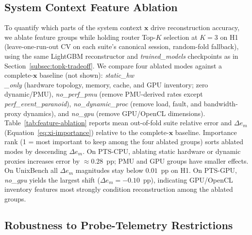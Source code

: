 \documentclass[sigplan,10pt]{acmart}
\newcommand{\ptscpu}{PTS-CPU}
\newcommand{\ptsgpu}{PTS-GPU}
\newcommand{\id}[1]{{\itshape #1}}
\begin{document}
\subsection{System Context Feature Ablation}
\label{subsec:feature-ablation}
To quantify which parts of the system context \(\mathbf{x}\) drive reconstruction accuracy, we ablate feature groups while holding router Top-$K$ selection at $K{=}3$ on H1 (leave-one-run-out CV on each suite's canonical session, random-fold fallback), using the same LightGBM reconstructor and \id{trained\_models} checkpoints as in Section~\ref{subsec:topk-tradeoff}.
We compare four ablated modes against a complete-\(\mathbf{x}\) baseline (not shown):
\id{static\_hw\\\_only} (hardware topology, memory, cache, and GPU inventory; zero dynamic/PMU),
\id{no\_perf\_pmu} (remove PMU-derived rates except \id{perf\_event\_paranoid}),
\id{no\_dynamic\_proc} (remove load, fault, and bandwidth-proxy dynamics),
and \id{no\_gpu} (remove GPU/OpenCL dimensions).
Table~\ref{tab:feature-ablation} reports mean out-of-fold suite relative error and $\Delta e_m$ (Equation~\ref{eq:xi-importance}) relative to the complete-\(\mathbf{x}\) baseline.
Importance rank (1 = most important to keep among the four ablated groups) sorts ablated modes by descending $\Delta e_m$.
On \ptscpu, ablating static hardware or dynamic  proxies increases error by ${\approx}0.28$~pp; PMU and GPU groups have smaller effects.
On UnixBench all $\Delta e_m$ magnitudes stay below $0.01$~pp on H1.
On \ptsgpu, \id{no\_gpu} yields the largest shift ($\Delta e_m = -0.10$~pp), indicating GPU/OpenCL inventory features most strongly condition reconstruction among the ablated groups.


\subsection{Robustness to Probe-Telemetry Restrictions}
\label{subsec:probe-ebpf-ablation}
\end{document}
